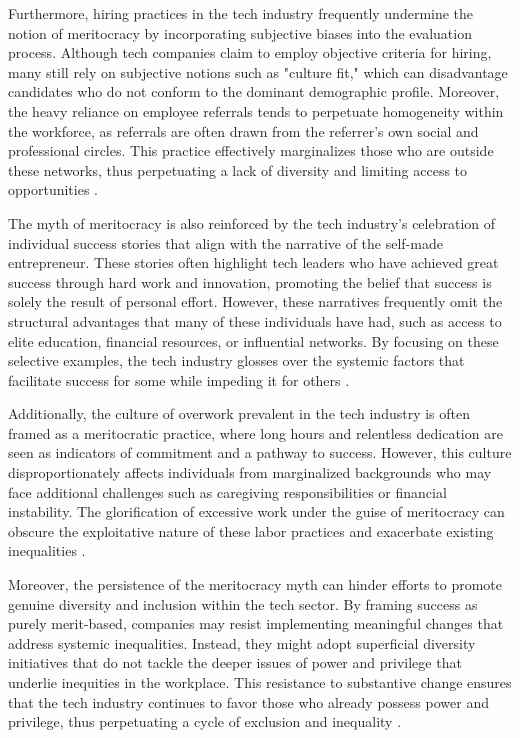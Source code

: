 \begin{refsection}
Furthermore, hiring practices in the tech industry frequently undermine the notion of meritocracy by incorporating subjective biases into the evaluation process. Although tech companies claim to employ objective criteria for hiring, many still rely on subjective notions such as "culture fit," which can disadvantage candidates who do not conform to the dominant demographic profile. Moreover, the heavy reliance on employee referrals tends to perpetuate homogeneity within the workforce, as referrals are often drawn from the referrer's own social and professional circles. This practice effectively marginalizes those who are outside these networks, thus perpetuating a lack of diversity and limiting access to opportunities \cite[pp.~999-1002]{rivera2012hiring}.

The myth of meritocracy is also reinforced by the tech industry's celebration of individual success stories that align with the narrative of the self-made entrepreneur. These stories often highlight tech leaders who have achieved great success through hard work and innovation, promoting the belief that success is solely the result of personal effort. However, these narratives frequently omit the structural advantages that many of these individuals have had, such as access to elite education, financial resources, or influential networks. By focusing on these selective examples, the tech industry glosses over the systemic factors that facilitate success for some while impeding it for others \cite[pp.~12-14]{saxenian1999regional}.

Additionally, the culture of overwork prevalent in the tech industry is often framed as a meritocratic practice, where long hours and relentless dedication are seen as indicators of commitment and a pathway to success. However, this culture disproportionately affects individuals from marginalized backgrounds who may face additional challenges such as caregiving responsibilities or financial instability. The glorification of excessive work under the guise of meritocracy can obscure the exploitative nature of these labor practices and exacerbate existing inequalities \cite[pp.~205-207]{wajcman2010feminist}.

Moreover, the persistence of the meritocracy myth can hinder efforts to promote genuine diversity and inclusion within the tech sector. By framing success as purely merit-based, companies may resist implementing meaningful changes that address systemic inequalities. Instead, they might adopt superficial diversity initiatives that do not tackle the deeper issues of power and privilege that underlie inequities in the workplace. This resistance to substantive change ensures that the tech industry continues to favor those who already possess power and privilege, thus perpetuating a cycle of exclusion and inequality \cite[pp.~32-35]{kalev2006best}.


\end{refsection}
